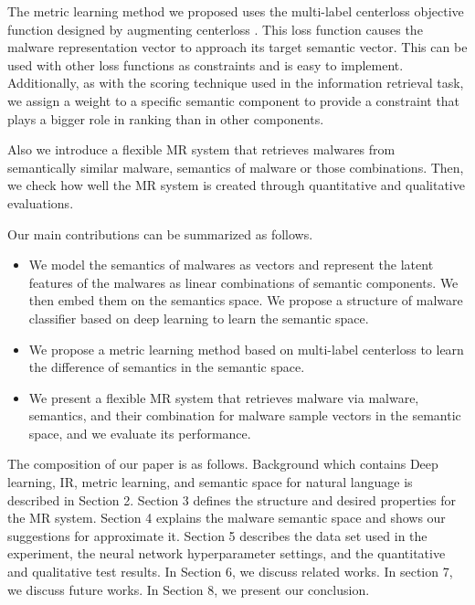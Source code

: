 The metric learning method we proposed uses the multi-label centerloss objective function designed by augmenting centerloss \cite{wen2016discriminative}. This loss function causes the malware representation vector to approach its target semantic vector. This can be used with other loss functions as constraints and is easy to implement. Additionally, as with the scoring technique used in the information retrieval task, we assign a weight to a specific semantic component to provide a constraint that plays a bigger role in ranking than in other components.

Also we introduce a flexible MR system that retrieves malwares from semantically similar malware, semantics of malware or those combinations. Then, we check how well the MR system is created through quantitative and qualitative evaluations.

Our main contributions can be summarized as follows.

\begin{itemize}
\item We model the semantics of malwares as vectors and represent the latent features of the malwares as linear combinations of semantic components. We then embed them on the semantics space. We propose a structure of malware classifier based on deep learning to learn the semantic space.
\item We propose a metric learning method based on multi-label centerloss to learn the difference of semantics in the semantic space.
\item We present a flexible MR system that retrieves malware via malware, semantics, and their combination for malware sample vectors in the semantic space, and we evaluate its performance.
\end{itemize}

The composition of our paper is as follows. Background which contains Deep learning, IR, metric learning, and semantic space for natural language is described in Section 2. Section 3 defines the structure and desired properties for the MR system. Section 4 explains the malware semantic space and shows our suggestions for approximate it. Section 5 describes the data set used in the experiment, the neural network hyperparameter settings, and the quantitative and qualitative test results. In Section 6, we discuss related works. In section 7, we discuss future works. In Section 8, we present our conclusion.









